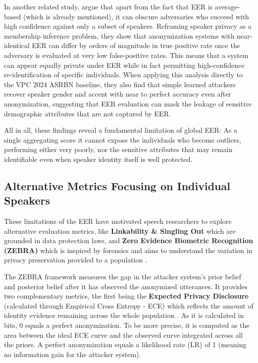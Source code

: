 \documentclass[12pt,leqno,a4paper]{article}
\begin{document}
In another related study, \cite{Tsaprazlis_2026} argue that apart from the fact that EER is average-based (which is already mentioned), it can obscure adversaries who 
succeed with high confidence against only a subset of speakers. 
Reframing speaker privacy as a membership inference problem, they show that anonymization systems with near-identical EER can differ by orders of magnitude in true positive rate 
once the adversary is evaluated at very low false-positive rates.
This means that a system can appear equally private under EER while in fact permitting high-confidence re-identification of specific individuals. 
When applying this analysis directly to the VPC 2024 ASRBN baseline, they also find that simple learned attackers recover speaker gender 
and accent with near to perfect accuracy even after anonymization, suggesting that EER evaluation can mask the leakage of sensitive demographic attributes that are not captured by EER.

All in all, these findings reveal a fundamental limitation of global EER: As a single aggregating score it cannot expose the individuals who become outliers, performing either very poorly, nor the sensitive attributes that may remain identifiable even when speaker identity itself is well protected. 

\subsection{Alternative Metrics Focusing on Individual Speakers}
These limitations of the EER have motivated speech researchers to explore alternative evaluation metrics, like \textbf{Linkability \& Singling Out} 
\citep{vauquier25_interspeech} which are grounded in data protection laws, and \textbf{Zero Evidence Biometric Recognition (ZEBRA)} which is inspired by forensics
and aims to understand the variation in privacy preservation provided to a population \citep{nautsch20_interspeech}. 

The ZEBRA framework measures the gap in the attacker system's prior belief and posterior belief after it has observed the anonymized utterances. 
It provides two complementary metrics, the first being the \textbf{Expected Privacy Disclosure} (calculated through Empirical Cross Entropy - ECE) 
which reflects the amount of identity evidence remaining across the whole population \citep{10.1016/j.csl.2021.101299, nautsch20_interspeech}. 
As it is calculated in bits, 0 equals a perfect anonymization. To be more precise, it is computed as the area between the ideal ECE curve and the 
observed curve integrated across all the priors. A perfect anonymization equals a likelihood rate (LR) of 1 (meaning no information gain for the attacker system).
\end{document}
